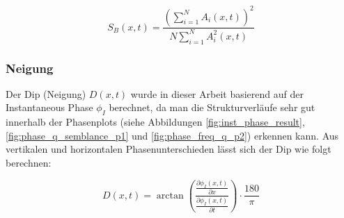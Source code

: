 \begin{equation}
    S_B(x, t) = \frac{\left( \sum_{i=1}^{N} A_i(x, t) \right)^2}{N \sum_{i=1}^{N} A_i^2(x, t)}
\end{equation}

%

\subsubsection{Neigung}

Der Dip (Neigung) $D(x, t)$ wurde in dieser Arbeit basierend auf der Instantaneous Phase $\phi_I$ berechnet, da man die Strukturverläufe sehr gut innerhalb der Phasenplots (siehe Abbildungen \ref{fig:inst_phase_result}, \ref{fig:phase_q_semblance_p1} und \ref{fig:phase_freq_q_p2}) erkennen kann. Aus vertikalen und horizontalen Phasenunterschieden lässt sich der Dip wie folgt berechnen:

\begin{equation}
    D(x, t) = \arctan\left( \frac{\frac{\partial \phi_I(x, t)}{\partial x}}{\frac{\partial \phi_I(x, t)}{\partial t}} \right) \cdot \frac{180}{\pi}
\end{equation}


